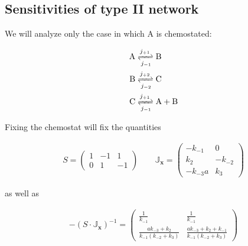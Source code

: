 \documentclass{article}
\begin{document}
	
	\subsection{Sensitivities of type II network}
	
	We will analyze only the case in which A is chemostated:
	
	\begin{center}
		\begin{equation}
			\label{ex1}
			\newline
			\begin{aligned}
				\mathrm{A} &\xrightleftharpoons[j_{-1}]{j_{+1}}\mathrm{B}\\
				\mathrm{B} &\xrightleftharpoons[j_{-2}]{j_{+2}}\mathrm{C}\\
				\mathrm{C} &\xrightleftharpoons[j_{-1}]{j_{+1}}\mathrm{A}+\mathrm{B}
			\end{aligned}
		\end{equation}
	\end{center}
	
	Fixing the chemostat will fix the quantities
	
	\begin{center}
		\begin{equation}
			\begin{aligned}
				S = \begin{pmatrix}
					1 & -1 & 1 \\
					0 & 1 & -1
				\end{pmatrix} \quad \quad
				\mathbb{J}_{\mathbf{x}} = \begin{pmatrix}
					- k_{-1} & 0 \\
					k_{2} & -k_{-2} \\
					- k_{-3} a & k_3
				\end{pmatrix}
				\label{88}
			\end{aligned}
		\end{equation}
	\end{center}
	
	as well as
	
	\begin{center}
		\begin{equation}
			\begin{aligned}
				- (S \cdot  \mathbb{J}_{\mathbf{x}})^{-1} = \begin{pmatrix}
					\frac{1}{k_{-1}} & \frac{1}{k_{-1}} \\
					\frac{a k_{-3}+k_2}{k_{-1}(k_{-2}+k_3)} & \frac{a k_{-3}+k_2+k_{-1}}{k_{-1}(k_{-2}+k_3)}  
				\end{pmatrix}
				\label{89}
			\end{aligned}
		\end{equation}
	\end{center}
	
\end{document}
